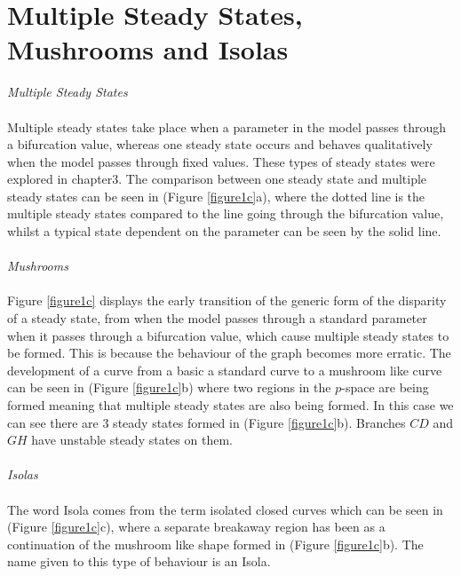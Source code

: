 \documentclass[a4paper]{report}
\theoremstyle{definition}
\begin{document}
\section{Multiple Steady States, Mushrooms and Isolas}
\textit{Multiple Steady States}
\\
\\
Multiple steady states take place when a parameter in the model passes through a bifurcation value, whereas one steady state occurs and behaves qualitatively  when the model passes through fixed values.  These types of steady states were explored in chapter3. The comparison between one steady state and multiple steady states can be seen in (Figure \ref{figure1c}a), where the dotted line is the multiple steady states compared to the line going through the bifurcation value, whilst a typical state dependent on the parameter can be seen by the solid line. 
\\
\\
\textit{Mushrooms}
\\
\\
Figure \ref{figure1c} displays the early transition of the generic form of the disparity of a steady state, from when the model passes through a standard parameter when it passes through a bifurcation value, which cause multiple steady states to be formed. This is because the behaviour of the graph becomes more erratic. The development of a curve from a basic a standard curve to a mushroom like curve can be seen in (Figure \ref{figure1c}b) where two regions in the $p$-space are being formed meaning that multiple steady states are also being formed. In this case we can see there are 3 steady states formed in (Figure \ref{figure1c}b). Branches $CD$ and $GH$ have unstable steady states on them.
\\
\\
\textit{Isolas}
\\
\\
The word Isola comes from the term isolated closed curves which can be seen in (Figure \ref{figure1c}c), where a separate breakaway region has been as a continuation of the mushroom like shape formed in (Figure \ref{figure1c}b). The name given to this type of behaviour is an Isola. 
\end{document}
